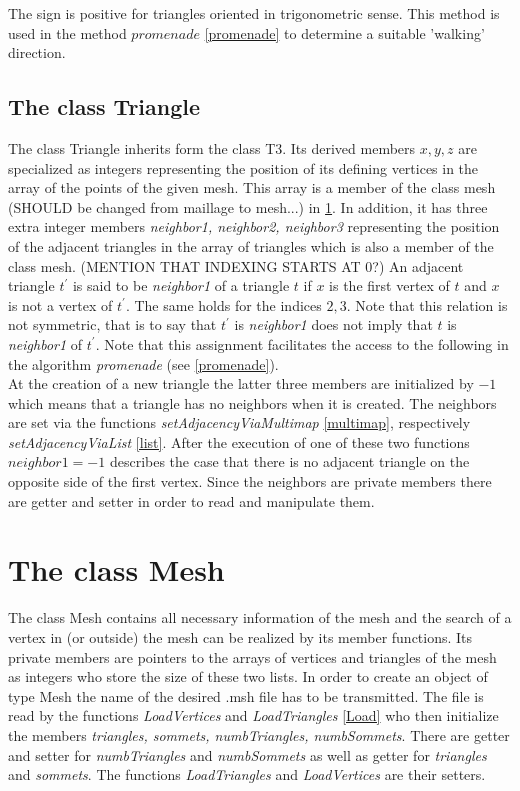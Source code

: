 \documentclass[10pt]{article}
\begin{document}
The sign is positive for triangles oriented in trigonometric sense. This method is used in the method $promenade$ \ref{promenade} to determine a suitable 'walking' direction.


\subsection{The class Triangle} \label{triangle}
The class Triangle inherits form the class T3. Its derived members $ x,y,z $ are specialized as integers representing the position of its defining vertices in the array of the points of the given mesh. This array is a member of the class mesh (SHOULD be changed from maillage to mesh...) in \ref{mesh}. In addition, it has three extra integer members {\itshape neighbor1, neighbor2, neighbor3} representing the position of the adjacent triangles in the array of triangles which is also a member of the class mesh. (MENTION THAT INDEXING STARTS AT 0?) An adjacent triangle $ t^{'} $ is said to be  {\itshape neighbor1 } of a triangle $ t $ if $ x $ is the first vertex of $t$ and $x$ is not a vertex of $ t^{'} $. The same holds for the indices $ 2,3 $. Note that this relation is not symmetric, that is to say that $ t^{'} $ is {\itshape neighbor1} does not imply that $t$ is {\itshape neighbor1} of $t^{'}$. 
Note that this assignment facilitates the access to the following in the algorithm {\itshape promenade} (see \ref{promenade}).  \\
At the creation of a new triangle the latter three members are initialized by $ -1 $ which means that a triangle has no neighbors when it is created. The neighbors are set via the functions {\itshape setAdjacencyViaMultimap} \ref{multimap}, respectively {\itshape setAdjacencyViaList} \ref{list}. After the execution of one of these two functions $neighbor1 =  -1 $ describes the case that there is no adjacent triangle on the opposite side of the first vertex. 
Since the neighbors are private members there are getter and setter in order to read and manipulate them. \\



\section{The class Mesh} \label{mesh}
The class Mesh contains all necessary information of the mesh and the search of a vertex in (or outside) the mesh can be realized by its member functions. Its private members are pointers to the arrays of vertices and triangles of the mesh as integers who store the size of these two lists.
In order to create an object of type Mesh the name of the desired .msh file has to be transmitted. The file is read by the functions {\itshape LoadVertices} and {\itshape LoadTriangles} \ref{Load} who then initialize the members {\itshape triangles, sommets, numbTriangles, numbSommets}. 
There are getter and setter for {\itshape numbTriangles} and {\itshape numbSommets} as well as getter for {\itshape triangles} and {\itshape sommets}. The functions {\itshape LoadTriangles} and {\itshape LoadVertices} are their setters. \\
\end{document}
